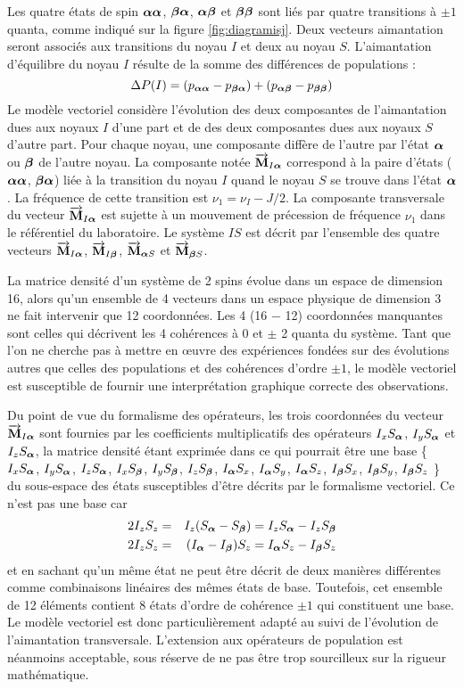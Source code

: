 Les quatre états de spin $\boldsymbol{\alpha}\boldsymbol{\alpha}$, $\boldsymbol{\beta}\boldsymbol{\alpha}$, $\boldsymbol{\alpha}\boldsymbol{\beta}$ et $\boldsymbol{\beta}\boldsymbol{\beta}$ sont liés par quatre
transitions à $\pm 1$ quanta, comme indiqué sur la figure \ref{fig:diagramisj}.
Deux vecteurs aimantation seront associés aux transitions du noyau $I$
et deux au noyau $S$.
L'aimantation d'équilibre du noyau $I$ résulte de la somme des différences de populations :
\begin{equation}
\Delta P(I) = (p_{\boldsymbol{\alpha}\boldsymbol{\alpha}} - p_{\boldsymbol{\beta}\boldsymbol{\alpha}}) + (p_{\boldsymbol{\alpha}\boldsymbol{\beta}} - p_{\boldsymbol{\beta}\boldsymbol{\beta}})
\end{equation}
Le modèle vectoriel considère l'évolution des deux composantes de l'aimantation dues
aux noyaux $I$ d'une part et de des deux composantes dues aux noyaux $S$ d'autre part.
Pour chaque noyau, une composante diffère de l'autre par l'état $\boldsymbol{\alpha}$ ou $\boldsymbol{\beta}$
de l'autre noyau.
La composante notée $\overrightarrow{\mathbf{M}}_{I\boldsymbol{\alpha}}$ correspond à la paire d'états
($\boldsymbol{\alpha}\boldsymbol{\alpha}$, $\boldsymbol{\beta}\boldsymbol{\alpha}$) liée à la transition du noyau $I$ quand le noyau $S$ 
se trouve dans l'état $\boldsymbol{\alpha}$.
La fréquence de cette transition est $\nu_1 = \nu_I - J/2$.
La composante transversale du vecteur $\overrightarrow{\mathbf{M}}_{I\boldsymbol{\alpha}}$ est sujette à un mouvement
de précession de fréquence $\nu_1$ dans le référentiel du laboratoire.
Le système $IS$ est décrit par l'ensemble des quatre
vecteurs $\overrightarrow{\mathbf{M}}_{I\boldsymbol{\alpha}}$, $\overrightarrow{\mathbf{M}}_{I\boldsymbol{\beta}}$,
$\overrightarrow{\mathbf{M}}_{\boldsymbol{\alpha} S}$ et $\overrightarrow{\mathbf{M}}_{\boldsymbol{\beta} S}$. 

La matrice densité d'un système de 2 spins évolue dans un espace de dimension 16, alors
qu'un ensemble de 4 vecteurs dans un espace physique de dimension 3 ne fait intervenir
que 12 coordonnées.
Les 4 (16 $-$ 12) coordonnées manquantes sont celles qui décrivent les 4 cohérences à
0 et $\pm$ 2 quanta du système.
Tant que l'on ne cherche pas à mettre en {\oe}uvre des expériences fondées sur des évolutions
autres que celles des populations et des cohérences d'ordre $\pm 1$,
le modèle vectoriel est susceptible de fournir une
interprétation graphique correcte des observations.

Du point de vue du formalisme des opérateurs, les trois coordonnées du
vecteur $\overrightarrow{\mathbf{M}}_{I\boldsymbol{\alpha}}$ sont fournies par les coefficients multiplicatifs
des opérateurs $I_xS_{\boldsymbol{\alpha}}$, $I_yS_{\boldsymbol{\alpha}}$ et $I_zS_{\boldsymbol{\alpha}}$, la matrice densité
étant exprimée dans ce qui pourrait être une base
\{
$I_xS_{\boldsymbol{\alpha}}$, $I_yS_{\boldsymbol{\alpha}}$, $I_zS_{\boldsymbol{\alpha}}$,
$I_xS_{\boldsymbol{\beta}}$, $I_yS_{\boldsymbol{\beta}}$, $I_zS_{\boldsymbol{\beta}}$,
$I_{\boldsymbol{\alpha}}S_x$, $I_{\boldsymbol{\alpha}}S_y$, $I_{\boldsymbol{\alpha}}S_z$,
$I_{\boldsymbol{\beta}}S_x$, $I_{\boldsymbol{\beta}}S_y$, $I_{\boldsymbol{\beta}}S_z$
\}
du sous-espace des états susceptibles d'être décrits par le formalisme vectoriel.
Ce n'est pas une base car
\begin{eqnarray}
\label{eqn:izsza}
2I_zS_z & = & I_z(S_{\boldsymbol{\alpha}}-S_{\boldsymbol{\beta}}) = I_zS_{\boldsymbol{\alpha}} - I_zS_{\boldsymbol{\beta}} \\
\label{eqn:izszb}
2I_zS_z & = & (I_{\boldsymbol{\alpha}}-I_{\boldsymbol{\beta}})S_z = I_{\boldsymbol{\alpha}}S_z - I_{\boldsymbol{\beta}}S_z
\end{eqnarray}
et en sachant qu'un même état ne peut être décrit de deux manières différentes
comme combinaisons linéaires des mêmes états de base.
Toutefois, cet ensemble de 12 éléments contient 8 états d'ordre de cohérence $\pm 1$
qui constituent une base.
Le modèle vectoriel est donc particulièrement adapté au suivi de l'évolution
de l'aimantation transversale.
L'extension aux opérateurs de population est néanmoins acceptable,
sous réserve de ne pas être trop sourcilleux sur la rigueur mathématique.

